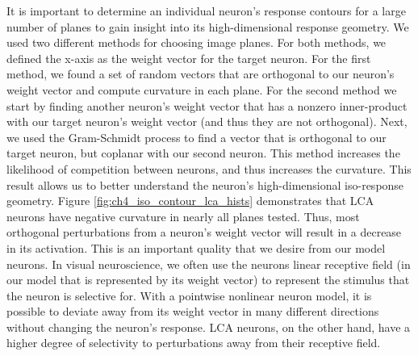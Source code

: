 It is important to determine an individual neuron’s response contours for a large number of planes to gain insight into its high-dimensional response geometry. We used two different methods for choosing image planes. For both methods, we defined the x-axis as the weight vector for the target neuron. For the first method, we found a set of random vectors that are orthogonal to our neuron’s weight vector and compute curvature in each plane. For the second method we start by finding another neuron’s weight vector that has a nonzero inner-product with our target neuron’s weight vector (and thus they are not orthogonal). Next, we used the Gram-Schmidt process to find a vector that is orthogonal to our target neuron, but coplanar with our second neuron. This method increases the likelihood of competition between neurons, and thus increases the curvature. This result allows us to better understand the neuron’s high-dimensional iso-response geometry. Figure \ref{fig:ch4_iso_contour_lca_hists} demonstrates that LCA neurons have negative curvature in nearly all planes tested. Thus, most orthogonal perturbations from a neuron's weight vector will result in a decrease in its activation. This is an important quality that we desire from our model neurons. In visual neuroscience, we often use the neurons linear receptive field (in our model that is represented by its weight vector) to represent the stimulus that the neuron is selective for. With a pointwise nonlinear neuron model, it is possible to deviate away from its weight vector in many different directions without changing the neuron's response. LCA neurons, on the other hand, have a higher degree of selectivity to perturbations away from their receptive field.


